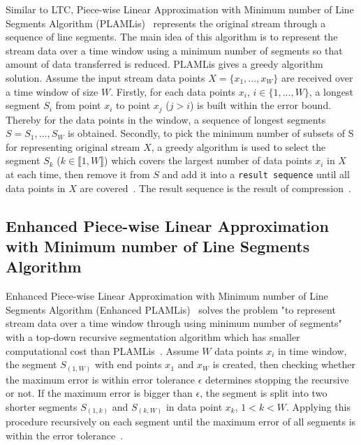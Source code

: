 Similar to LTC, Piece-wise Linear Approximation with Minimum number of Line
Segments Algorithm (PLAMLis)~\cite{liu2007energy} represents the original stream
through a sequence of line segments. The main idea of this algorithm is to
represent the stream data over a time window using a minimum number of segments
so that amount of data transferred is reduced. PLAMLis gives a greedy algorithm
solution. Assume the input stream data points $X=\{x_1, ..., x_W\}$ are received
over a time window of size $W$. Firstly, for each data points $x_i$, $i \in 
\{1, ..., W\}$, a longest segment $S_{i}$ from point $x_i$ to point $x_j$
($j>i$) is built within the error bound. Thereby for the data points in the
window, a sequence of longest segments $S = {S_1, ..., S_W}$ is obtained.
Secondly, to pick the minimum number of subsets of S for representing original
stream $X$, a greedy algorithm is used to select the segment $S_k$ ($k \in
\llbracket1, W\rrbracket$) which covers the largest number of data points $x_i$
in $X$ at each time, then remove it from $S$ and add it into a \texttt{result
sequence} until all data points in $X$ are covered~\cite{liu2007energy}. The
result sequence is the result of compression~\cite{zordan2012compress,
zordan2014performance}.


\subsection{Enhanced Piece-wise Linear Approximation with Minimum number of Line
Segments Algorithm} 

Enhanced Piece-wise Linear Approximation with Minimum number of Line Segments
Algorithm (Enhanced PLAMLis)~\cite{pham2008enhance} solves the problem "to
represent stream data over a time window through using minimum number of
segments" with a top-down recursive segmentation algorithm which has smaller
computational cost than PLAMLis~\cite{pham2008enhance, zordan2014performance}.
Assume $W$ data points $x_i$ in time window, the segment $S_{(1, W)}$ with end
points $x_1$ and $x_W$ is created, then checking whether the maximum error is
within error tolerance $\epsilon$ determines stopping the recursive or not. If
the maximum error is bigger than $\epsilon$, the segment is split into two
shorter segments $S_{(1, k)}$ and $S_{(k, W)}$ in data point $x_k$, $1<k<W$.
Applying this procedure recursively on each segment until the maximum error of
all segments is within the error tolerance~\cite{pham2008enhance,
zordan2014performance}. 



